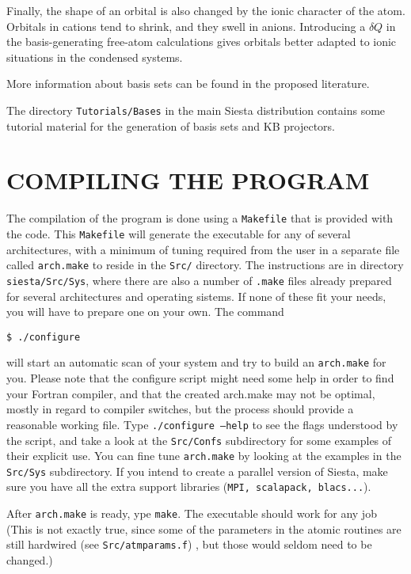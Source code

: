 \documentclass[11pt]{article}
\begin{document}
  Finally, the shape of an orbital is also changed by the ionic character 
of the atom. 
  Orbitals in cations tend to shrink, and they swell in anions.
  Introducing a $\delta Q$ in the basis-generating free-atom calculations
gives orbitals better adapted to ionic situations in the condensed
systems.

  More information about basis sets can be found in the proposed
  literature.

The directory {\tt Tutorials/Bases} in the main {\sc Siesta
  distribution} contains some tutorial material for the generation of
basis sets and KB projectors.

\section{COMPILING THE PROGRAM}

The compilation of the program is done using a {\tt Makefile}
that is provided with the code.
This {\tt Makefile} will generate the executable for any of several
architectures, with a  minimum of tuning required from the
user in a separate file called {\tt arch.make} to reside in
the {\tt Src/} directory. 
The instructions are in directory {\tt siesta/Src/Sys}, where 
there are also a number of {\tt .make} files
already prepared for several architectures and
operating sistems.
If none of these fit your needs, you will have to prepare
one on your own. 
The command

\noindent 
{\tt \$ ./configure} 

\noindent
 will start an automatic scan of your system and try to build
an {\tt arch.make} for you. Please note that the configure script
might need some help in order to find your Fortran compiler, and that
the created arch.make may not be optimal, mostly in regard to compiler
switches, but the process should provide a reasonable working
file. Type {\tt ./configure --help} to see the flags understood by the
script, and take a look at the {\tt Src/Confs} subdirectory for some
examples of their explicit use. You can fine tune {\tt arch.make}
by looking at the examples in the {\tt Src/Sys} subdirectory.
If you intend to create a parallel version of {\sc
Siesta}, make sure you have all the extra support libraries ({\tt MPI,
scalapack, blacs...}). 

After {\tt arch.make} is ready, ype {\tt make}. The executable should work
for any job (This is not exactly true, since some of the parameters in
the atomic routines are still hardwired (see {\tt Src/atmparams.f}) ,
but those would seldom need to be changed.)
\end{document}
